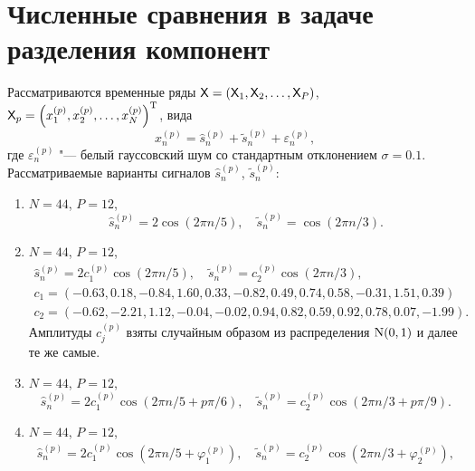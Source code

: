 \documentclass[specialist,
    substylefile = spbu_report.rtx,
    subf,href,colorlinks=true, 12pt]{disser}
\theoremstyle{plain}
\theoremstyle{definition}
\theoremstyle{remark}
\begin{document}
    \section{Численные сравнения в задаче разделения компонент}\label{sec:numerical-comp-sep}
    Рассматриваются временные ряды $\mathsf{X} = \left(\mathsf{X}_1, \mathsf{X}_2, \ldots, \mathsf{X}_P\right)$, 
    $\mathsf{X}_p = \left(x_1^{(p)}, x_2^{(p)}, \ldots, x_N^{(p)}\right)^{\mathrm{T}}$, вида
    \begin{equation*}
        x_n^{(p)} = \hat{s}_n^{(p)} + \tilde{s}_n^{(p)} + \varepsilon_n^{(p)},
    \end{equation*}
    где $\varepsilon_n^{(p)}$ "--- белый гауссовский шум со стандартным отклонением $\sigma = 0.1$. 
    Рассматриваемые варианты сигналов $\hat{s}_n^{(p)}$, $\tilde{s}_n^{(p)}$:
    \begin{enumerate}
        \item $N = 44$, $P = 12$,
        \begin{equation}
           \hat{s}_n^{(p)} = 2 \cos(2 \pi n / 5), \quad \tilde{s}_n^{(p)} = \cos(2\pi n /3).
           \label{eq:sep-same}
        \end{equation}
        \item $N = 44$, $P = 12$,
        \begin{gather}
            \hat{s}_n^{(p)} = 2 c_1^{(p)} \cos(2 \pi n / 5), \quad \tilde{s}_n^{(p)} = c_2^{(p)}\cos(2\pi n /3),
            \label{eq:sep-coeffs}\\
            c_1 = \left(-0.63, 0.18, -0.84, 1.60, 0.33, -0.82, 0.49, 0.74, 0.58, -0.31, 1.51, 0.39\right)\nonumber\\
            c_2 = \left(-0.62, -2.21, 1.12, -0.04, -0.02, 0.94, 0.82, 0.59, 0.92, 0.78, 0.07, -1.99 \right). \nonumber
        \end{gather}
        Амплитуды $c_j^{(p)}$ взяты случайным образом из распределения $\mathrm{N}(0, 1)$ и далее те же самые.
        \item $N = 44$, $P = 12$,
        \begin{equation}
            \hat{s}_n^{(p)} = 2 c_1^{(p)} \cos(2 \pi n / 5 + p \pi / 6), 
            \quad \tilde{s}_n^{(p)} = c_2^{(p)}\cos(2\pi n /3 + p \pi / 9).
            \label{eq:sep-lin-phase}
        \end{equation}
        \item $N = 44$, $P = 12$,
        \begin{gather}
               \hat{s}_n^{(p)} = 2 c_1^{(p)} \cos(2 \pi n / 5 + \varphi_1^{(p)}), 
               \quad \tilde{s}_n^{(p)} = c_2^{(p)}\cos(2\pi n /3 + \varphi_2^{(p)}),

\end{gather}
\end{enumerate}
\end{document}
